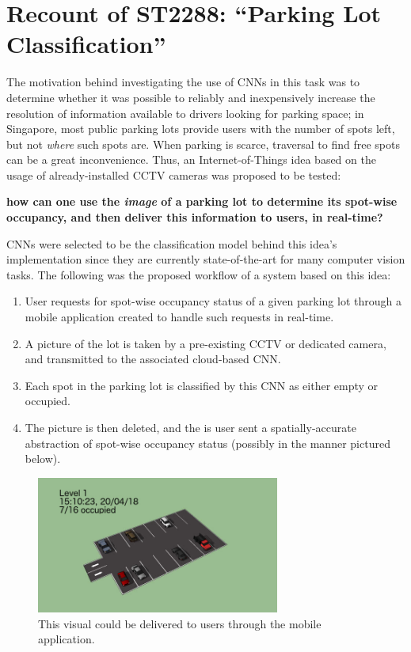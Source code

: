 \documentclass[a4paper, 11pt]{article} %
\begin{document}
\section{Recount of ST2288: ``Parking Lot Classification''}
	The motivation behind investigating the use of CNNs in this task was to determine whether it was 
	possible to reliably and inexpensively increase the resolution of information available to drivers 
	looking for parking space; in Singapore, most public parking lots provide users with the number of 
	spots left, but not \textit{where} such spots are. When parking is scarce, traversal to find free spots 
	can be a great inconvenience. Thus, an Internet-of-Things idea based on the usage of 
	already-installed CCTV cameras was proposed to be tested:
	\begin{center}
		\textbf{
			how can one use the \textit{image} of a parking lot to determine its spot-wise occupancy, and 
			then deliver this information to users, in real-time?
		}
	\end{center}
	CNNs were selected to be the classification model behind this idea's implementation since they are 
	currently state-of-the-art for many computer vision tasks.
	\newpage
	\hspace*{-6mm}The  following was the proposed workflow of a system based on this idea: 
	\begin{enumerate}
		\item User requests for spot-wise occupancy status of a given parking lot through a mobile 
		application created to handle such requests in real-time.
		\item A picture of the lot is taken by a pre-existing CCTV or dedicated camera, and transmitted to 
		the associated cloud-based CNN.
		\item Each spot in the parking lot is classified by this CNN as either empty or occupied.
		\item The picture is then deleted, and the is user sent a spatially-accurate abstraction of 
		spot-wise occupancy status (possibly in the manner pictured below).
	\end{enumerate}
	\begin{figure}[h]
		\centering
		\includegraphics[width=8cm]{figures/mock-up.jpg}
		\caption{This visual could be delivered to users through the mobile application.}
	\end{figure}
\end{document}
